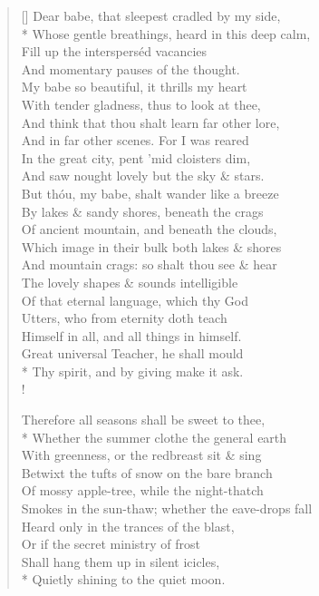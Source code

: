 \documentclass[MAIN]{subfiles}
\begin{document}
\begin{verse}[\versewidth]
Dear babe, that sleepest cradled by my side,\\*
Whose gentle breathings, heard in this deep calm,\\
Fill up the intersperséd vacancies\\
And momentary pauses of the thought.\\
My babe so beautiful, it thrills my heart\\
With tender gladness, thus to look at thee,\\
And think that thou shalt learn far other lore,\\
And in far other scenes. For I was reared\\
In the great city, pent 'mid cloisters dim,\\
And saw nought lovely but the sky \& stars.\\
But th\'ou, my babe, shalt wander like a breeze\\
By lakes \& sandy shores, beneath the crags\\
Of ancient mountain, and beneath the clouds,\\
Which image in their bulk both lakes \& shores\\
And mountain crags: so shalt thou see \& hear\\
The lovely shapes \& sounds intelligible\\
Of that eternal language, which thy God\\
Utters, who from eternity doth teach\\
Himself in all, and all things in himself.\\
Great universal Teacher, he shall mould\\*
Thy spirit, and by giving make it ask.\\!

Therefore all seasons shall be sweet to thee,\\*
Whether the summer clothe the general earth\\
With greenness, or the redbreast sit \& sing\\
Betwixt the tufts of snow on the bare branch\\
Of mossy apple-tree, while the night-thatch\\
Smokes in the sun-thaw; whether the eave-drops fall\\
Heard only in the trances of the blast,\\
Or if the secret ministry of frost\\
Shall hang them up in silent icicles,\\*
Quietly shining to the quiet moon.
\end{verse}
\end{document}
